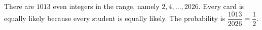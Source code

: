 There are $1013$ even integers in the range, namely $2,4,\ldots,2026$. Every card is equally likely because every student is equally likely. The probability is $\dfrac{1013}{2026}=\boxed{\dfrac{1}{2}}$.
